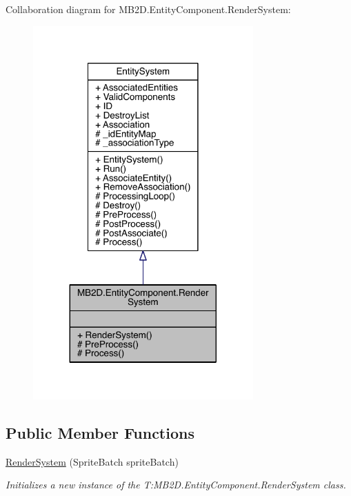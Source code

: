Collaboration diagram for M\+B2\+D.\+Entity\+Component.\+Render\+System\+:
\nopagebreak
\begin{figure}[H]
\begin{center}
\leavevmode
\includegraphics[width=239pt]{class_m_b2_d_1_1_entity_component_1_1_render_system__coll__graph}
\end{center}
\end{figure}
\subsection*{Public Member Functions}
\begin{DoxyCompactItemize}
\item 
\hyperlink{class_m_b2_d_1_1_entity_component_1_1_render_system_a3f09291aad8620444cc5248def8431b2}{Render\+System} (Sprite\+Batch sprite\+Batch)
\begin{DoxyCompactList}\small\item\em Initializes a new instance of the T\+:\+M\+B2\+D.\+Entity\+Component.\+Render\+System class. \end{DoxyCompactList}\end{DoxyCompactItemize}

